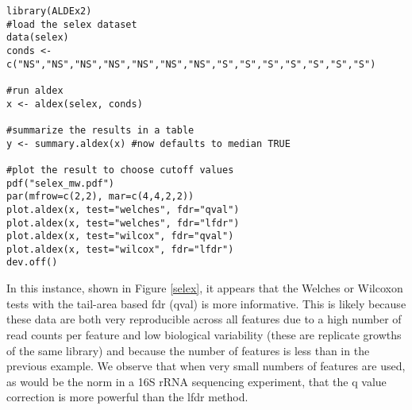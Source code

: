 \documentclass[11pt]{amsart}
\begin{document}
\begin{verbatim}
library(ALDEx2)
#load the selex dataset
data(selex)
conds <- c("NS","NS","NS","NS","NS","NS","NS","S","S","S","S","S","S","S")

#run aldex
x <- aldex(selex, conds)

#summarize the results in a table
y <- summary.aldex(x) #now defaults to median TRUE

#plot the result to choose cutoff values
pdf("selex_mw.pdf")
par(mfrow=c(2,2), mar=c(4,4,2,2))
plot.aldex(x, test="welches", fdr="qval")
plot.aldex(x, test="welches", fdr="lfdr")
plot.aldex(x, test="wilcox", fdr="qval")
plot.aldex(x, test="wilcox", fdr="lfdr")
dev.off()
\end{verbatim}
\vspace{12pt}
In this instance,  shown in Figure \ref{selex}, it appears that the Welches or Wilcoxon tests with the tail-area based fdr (qval) is more informative. This is likely because these data are both very reproducible across all features due to a high number of read counts per feature and low biological variability (these are replicate growths of the same library) and because the number of features is less than in the previous example. We observe that when very small numbers of features are used, as would be the norm in a 16S rRNA sequencing experiment, that the q value correction is more powerful than the lfdr method.

 





\end{document}
